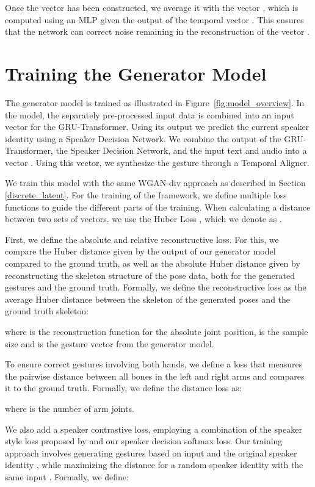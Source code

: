 \documentclass[sigconf]{acmart}
\begin{document}
Once the vector  has been constructed, we average it with the vector , which is computed using an MLP given the output of the temporal vector . This ensures that the network can correct noise remaining in the reconstruction of the vector .
 
 
\section{Training the Generator Model} \label{training_proc}
The generator model is trained as illustrated in Figure~\ref{fig:model_overview}. In the model, the separately pre-processed input data is combined into an input vector for the GRU-Transformer. Using its output we predict the current speaker identity using a Speaker Decision Network. We combine the output of the GRU-Transformer, the Speaker Decision Network, and the input text and audio into a vector . Using this vector, we synthesize the gesture  through a Temporal Aligner. 

We train this model with the same WGAN-div approach as described in Section \ref{discrete_latent}.
For the training of the framework, we define multiple loss functions to guide the different parts of the training. When calculating a distance between two sets of vectors, we use the Huber Loss \cite{huberRobustEstimationLocation1964}, which we denote as . 

First, we define the absolute and relative reconstructive loss. For this, we compare the Huber distance given by the output of our generator model compared to the ground truth, as well as the absolute Huber distance given by reconstructing the skeleton structure of the pose data, both for the generated gestures and the ground truth. Formally, we define the reconstructive loss as the average Huber distance between the skeleton of the generated poses and the ground truth skeleton:

where  is the reconstruction function for the absolute joint position,  is the sample size and  is the gesture vector from the generator model. 

To ensure correct gestures involving both hands, we define a loss that measures the pairwise distance between all bones in the left and right arms and compares it to the ground truth. Formally, we define the distance loss as:

where  is the number of arm joints.

We also add a speaker contrastive loss, employing a combination of the speaker style loss proposed by \citet{yoonSpeechGestureGeneration2020} and our speaker decision softmax loss. Our training approach involves generating gestures based on input  and the original speaker identity , while maximizing the distance for a random speaker identity  with the same input . Formally, we define:
\end{document}
